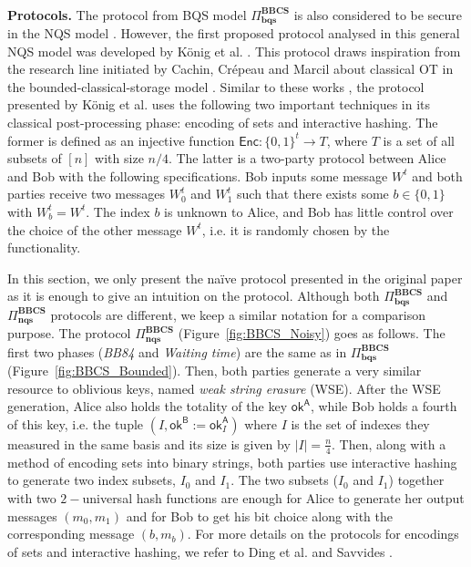\

\noindent\textbf{Protocols.} The protocol from BQS model $\Pi^{\textbf{BBCS}}_{\textbf{bqs}}$ is also considered to be secure in the NQS model \cite{S10}. However, the first proposed protocol analysed in this general NQS model was developed by K\"onig et al. \cite{KWW12}. This protocol draws inspiration from the research line initiated by Cachin, Crépeau and Marcil \cite{CCM98} about classical OT in the bounded-classical-storage model \cite{DHRS04, S07}. Similar to these works \cite{CCM98, DHRS04, S07}, the protocol presented by K\"onig et al. \cite{KWW12} uses the following two important techniques in its classical post-processing phase: encoding of sets and interactive hashing. The former is defined as an injective function $\mathsf{Enc}: \{0,1\}^t \rightarrow T$, where $T$ is a set of all subsets of $[n]$ with size $n/4$. The latter is a two-party protocol between Alice and Bob with the following specifications. Bob inputs some message $W^t$ and both parties receive two messages $W^t_0$ and $W^t_1$ such that there exists some $b\in\{0,1\}$ with $W^t_b = W^t$. The index $b$ is unknown to Alice, and Bob has little control over the choice of the other message $W^t$, i.e. it is randomly chosen by the functionality. %


In this section, we only present the na\"ive protocol presented in the original paper \cite{KWW12} as it is enough to give an intuition on the protocol. Although both $\Pi^{\textbf{BBCS}}_{\textbf{bqs}}$ and $\Pi^{\textbf{BBCS}}_{\textbf{nqs}}$ protocols are different, we keep a similar notation for a comparison purpose. The protocol $\Pi^{\textbf{BBCS}}_{\textbf{nqs}}$ (Figure~\ref{fig:BBCS_Noisy}) goes as follows. The first two phases (\textit{BB84} and \textit{Waiting time}) are the same as in $\Pi^{\textbf{BBCS}}_{\textbf{bqs}}$ (Figure~\ref{fig:BBCS_Bounded}). Then, both parties generate a very similar resource to oblivious keys, named \textit{weak string erasure} (WSE). After the WSE generation, Alice also holds the totality of the key $\mathsf{ok}^{\mathsf{A}}$, while Bob holds a fourth of this key, i.e. the tuple $(I, \mathsf{ok}^{\mathsf{B}} := \mathsf{ok}^{\mathsf{A}}_I)$ where $I$ is the set of indexes they measured in the same basis and its size is given by $|I| = \frac{n}{4}$. Then, along with a method of encoding sets into binary strings, both parties use interactive hashing to generate two index subsets, $I_0$ and $I_1$. The two subsets ($I_0$ and $I_1$) together with two $2-$universal hash functions are enough for Alice to generate her output messages $(m_0, m_1)$ and for Bob to get his bit choice along with the corresponding message $(b, m_b)$. For more details on the protocols for encodings of sets and interactive hashing, we refer to Ding et al. \cite{DHRS04} and Savvides \cite{S07}.

